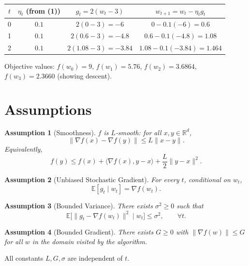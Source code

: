 \documentclass{article}
\newtheorem{assumption}{Assumption}
\newcommand{\E}{\mathbb{E}}
\newcommand{\R}{\mathbb{R}}
\begin{document}
\begin{center}
\begin{tabular}{c|c|c|c}
$t$ & $\eta_t$ (from (1)) & $g_t=2(w_t-3)$ & $w_{t+1}=w_t-\eta_t g_t$ \\ \hline
0 & $0.1$ & $2(0-3)=-6$ & $0-0.1(-6)=0.6$ \\ 
1 & $0.1$ & $2(0.6-3)=-4.8$ & $0.6-0.1(-4.8)=1.08$ \\ 
2 & $0.1$ & $2(1.08-3)=-3.84$ & $1.08-0.1(-3.84)=1.464$ 
\end{tabular}
\end{center}
Objective values: $f(w_0)=9$, $f(w_1)=5.76$, $f(w_2)=3.6864$, $f(w_3)=2.3660$ (showing descent).

\section*{Assumptions}
\begin{assumption}[Smoothness]\label{as:smooth}
$f$ is $L$‑smooth: for all $x,y\in\R^{d}$,
\[
\|\nabla f(x)-\nabla f(y)\|\le L\|x-y\|.
\tag{3}
\]
Equivalently,
\[
f(y)\le f(x)+\langle\nabla f(x),y-x\rangle+\frac{L}{2}\|y-x\|^{2}.
\tag{4}
\]
\end{assumption}

\begin{assumption}[Unbiased Stochastic Gradient]\label{as:unbiased}
For every $t$, conditional on $w_t$,
\[
\E[g_t\mid w_t]=\nabla f(w_t).
\tag{5}
\]
\end{assumption}

\begin{assumption}[Bounded Variance]\label{as:variance}
There exists $\sigma^{2}\ge0$ such that
\[
\E\bigl[\|g_t-\nabla f(w_t)\|^{2}\mid w_t\bigr]\le\sigma^{2},\qquad\forall t.
\tag{6}
\]
\end{assumption}

\begin{assumption}[Bounded Gradient]\label{as:gradbound}
There exists $G\ge0$ with $\|\nabla f(w)\|\le G$ for all $w$ in the domain visited by the algorithm.
\end{assumption}

All constants $L,G,\sigma$ are independent of $t$.
\end{document}
